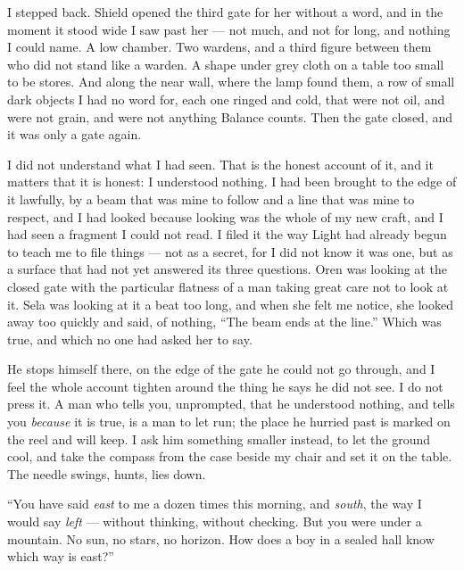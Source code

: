 I stepped back. Shield opened the third gate for her without a word, and in the moment it stood wide I saw past her --- not much, and not for long, and nothing I could name. A low chamber. Two wardens, and a third figure between them who did not stand like a warden. A shape under grey cloth on a table too small to be stores. And along the near wall, where the lamp found them, a row of small dark objects I had no word for, each one ringed and cold, that were not oil, and were not grain, and were not anything Balance counts. Then the gate closed, and it was only a gate again.\par

I did not understand what I had seen. That is the honest account of it, and it matters that it is honest: I understood nothing. I had been brought to the edge of it lawfully, by a beam that was mine to follow and a line that was mine to respect, and I had looked because looking was the whole of my new craft, and I had seen a fragment I could not read. I filed it the way Light had already begun to teach me to file things --- not as a secret, for I did not know it was one, but as a surface that had not yet answered its three questions. Oren was looking at the closed gate with the particular flatness of a man taking great care not to look at it. Sela was looking at it a beat too long, and when she felt me notice, she looked away too quickly and said, of nothing, ``The beam ends at the line.'' Which was true, and which no one had asked her to say.\par

\ornament

\noindent He stops himself there, on the edge of the gate he could not go through, and I feel the whole account tighten around the thing he says he did not see. I do not press it. A man who tells you, unprompted, that he understood nothing, and tells you \textit{because} it is true, is a man to let run; the place he hurried past is marked on the reel and will keep. I ask him something smaller instead, to let the ground cool, and take the compass from the case beside my chair and set it on the table. The needle swings, hunts, lies down.\par

``You have said \textit{east} to me a dozen times this morning, and \textit{south}, the way I would say \textit{left} --- without thinking, without checking. But you were under a mountain. No sun, no stars, no horizon. How does a boy in a sealed hall know which way is east?''\par

